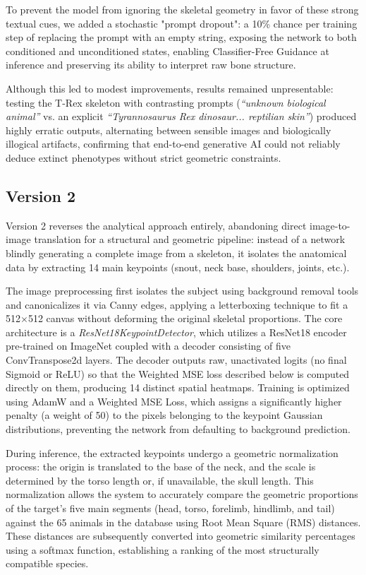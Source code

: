 \documentclass{article}
\begin{document}
To prevent the model from ignoring the skeletal geometry in favor of these strong textual cues, we added a stochastic "prompt dropout": a 10\% chance per training step of replacing the prompt with an empty string, exposing the network to both conditioned and unconditioned states, enabling Classifier-Free Guidance at inference and preserving its ability to interpret raw bone structure.

Although this led to modest improvements, results remained unpresentable: testing the T-Rex skeleton with contrasting prompts (\textit{``unknown biological animal''} vs. an explicit \textit{``Tyrannosaurus Rex dinosaur... reptilian skin''}) produced highly erratic outputs, alternating between sensible images and biologically illogical artifacts, confirming that end-to-end generative AI could not reliably deduce extinct phenotypes without strict geometric constraints.

\subsection{Version 2}
Version 2 reverses the analytical approach entirely, abandoning direct image-to-image translation for a structural and geometric pipeline: instead of a network blindly generating a complete image from a skeleton, it isolates the anatomical data by extracting 14 main keypoints (snout, neck base, shoulders, joints, etc.).

The image preprocessing first isolates the subject using background removal tools and canonicalizes it via Canny edges, applying a letterboxing technique to fit a 512$\times$512 canvas without deforming the original skeletal proportions. The core architecture is a \textit{ResNet18KeypointDetector}, which utilizes a ResNet18 encoder pre-trained on ImageNet coupled with a decoder consisting of five ConvTranspose2d layers. The decoder outputs raw, unactivated logits (no final Sigmoid or ReLU) so that the Weighted MSE loss described below is computed directly on them, producing 14 distinct spatial heatmaps. Training is optimized using AdamW and a Weighted MSE Loss, which assigns a significantly higher penalty (a weight of 50) to the pixels belonging to the keypoint Gaussian distributions, preventing the network from defaulting to background prediction.

During inference, the extracted keypoints undergo a geometric normalization process: the origin is translated to the base of the neck, and the scale is determined by the torso length or, if unavailable, the skull length. This normalization allows the system to accurately compare the geometric proportions of the target's five main segments (head, torso, forelimb, hindlimb, and tail) against the 65 animals in the database using Root Mean Square (RMS) distances. These distances are subsequently converted into geometric similarity percentages using a softmax function, establishing a ranking of the most structurally compatible species.
\end{document}
